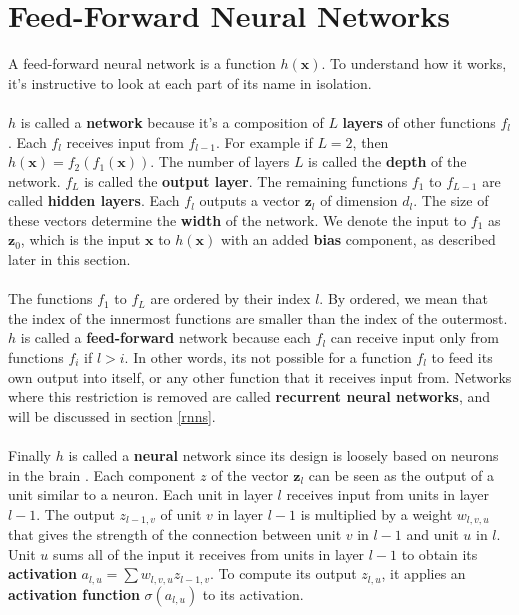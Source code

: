 \section{Feed-Forward Neural Networks}
A feed-forward neural network is a function $h(\mathbf{x})$. To understand how it works, it's instructive to look at each part of its name in isolation.
\\\\
$h$ is called a \textbf{network} because it's a composition of $L$ \textbf{layers} of other functions $f_l$. Each $f_l$ receives input from $f_{l-1}$. For example if $L = 2$, then $h(\mathbf{x}) = f_2(f_1(\mathbf{x}))$. The number of layers $L$ is called the \textbf{depth} of the network. $f_L$ is called the \textbf{output layer}. The remaining functions $f_1$ to $f_{L-1}$ are called \textbf{hidden layers}. Each $f_l$ outputs a vector $\mathbf{z}_l$ of dimension $d_l$. The size of these vectors determine the \textbf{width} of the network. We denote the input to $f_1$ as $\mathbf{z}_0$, which is the input $\mathbf{x}$ to $h(\mathbf{x})$ with an added \textbf{bias} component, as described later in this section.
\\\\
The functions $f_1$ to $f_L$ are ordered by their index $l$. By ordered, we mean that the index of the innermost functions are smaller than the index of the outermost. $h$ is called a \textbf{feed-forward} network because each $f_l$ can receive input only from functions $f_i$ if $l > i$. In other words, its not possible for a function $f_l$ to feed its own output into itself, or any other function that it receives input from. Networks where this restriction is removed are called \textbf{recurrent neural networks}, and will be discussed in section \ref{rnns}.
\\\\
Finally $h$ is called a \textbf{neural} network since its design is loosely based on neurons in the brain \citep{goodfellow16}. Each component $z$ of the vector $\mathbf{z}_l$ can be seen as the output of a unit similar to a neuron. Each unit in layer $l$ receives input from units in layer $l-1$. The output $z_{l-1,v}$ of unit $v$ in layer $l-1$ is multiplied by a weight $w_{l,v,u}$ that gives the strength of the connection between unit $v$ in $l-1$ and unit $u$ in $l$. Unit $u$ sums all of the input it receives from units in layer $l-1$ to obtain its \textbf{activation} $a_{l,u} = \sum w_{l,v,u}z_{l-1,v}$. To compute its output $z_{l,u}$, it applies an \textbf{activation function} $\sigma(a_{l,u})$ to its activation.

